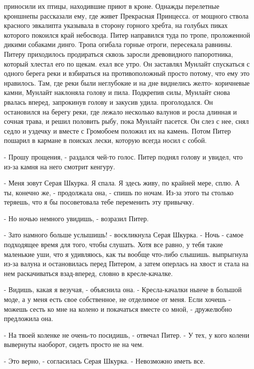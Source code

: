 приносили их птицы, находившие приют в кроне. Однажды перелетные 
кроншнепы рассказали ему, где живет Прекрасная Принцесса.
 от мощного ствола красного эвкалипта указывала в сторону 
горного хребта, на голубых пиках которого покоился край небосвода. 
Питер направился туда по тропе, проложенной дикими собаками динго. 
Тропа огибала горные отроги, пересекала равнины. Питеру приходилось 
продираться сквозь заросли древовидного папоротника, который хлестал 
его по щекам.
 ехал все утро. Он заставлял Мунлайт спускаться с одного берега 
реки и взбираться на противоположный просто потому, что ему это 
нравилось. Там, где реки были неглубокие и на дне виднелись желто-
коричневые камни, Мунлайт наклоняла голову и пила. Подкрепив силы, 
Мунлайт снова рвалась вперед, запрокинув голову и закусив удила.
 проголодался. Он остановился на берегу реки, где лежало 
несколько валунов и росла длинная и сочная трава, и решил половить 
рыбу, пока Мунлайт пасется. Он слез с нее, снял седло и уздечку и 
вместе с Громобоем положил их на камень. Потом Питер пошарил в кармане 
в поисках лески, которую всегда носил с собой.
\par- Прошу прощения, - раздался чей-то голос. Питер поднял голову и 
увидел, что из-за камня на него смотрит кенгуру.
\par- Меня зовут Серая Шкурка. Я спала. Я здесь живу, по крайней мере, 
сплю. А ты, конечно же, - продолжала она, - спишь по ночам. Из-за 
этого ты столько теряешь, что я бы посоветовала тебе переменить эту 
привычку.
\par- Но ночью немного увидишь, - возразил Питер.
\par- Зато намного больше услышишь! - воскликнула Серая Шкурка. - Ночь 
- самое подходящее время для того, чтобы слушать. Хотя все равно, у 
тебя такие маленькие уши, что я удивляюсь, как ты вообще что-либо 
слышишь.
 выпрыгнула из-за валуна и остановилась перед Питером, а затем 
оперлась на хвост и стала на нем раскачиваться взад-вперед, словно в 
кресле-качалке.
\par- Видишь, какая я везучая, - объяснила она. - Кресла-качалки нынче 
в большой моде, а у меня есть свое собственное, не отделимое от меня. 
Если хочешь - можешь сесть ко мне на колено и покачаться вместе со 
мной, - дружелюбно предложила она.
\par- На твоей коленке не очень-то посидишь, - отвечал Питер. - У тех, 
у кого колени вывернуты наоборот, сидеть просто не на чем.
\par- Это верно, - согласилась Серая Шкурка. - Невозможно иметь все. 
